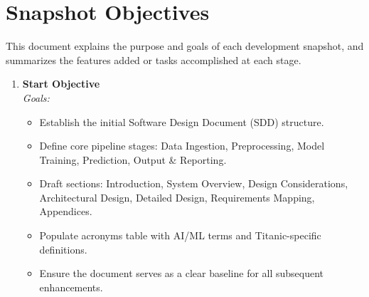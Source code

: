 \documentclass[12pt]{article}
\begin{document}
\section*{Snapshot Objectives}

This document explains the purpose and goals of each development snapshot, and summarizes the features added or tasks accomplished at each stage.

\begin{enumerate}[label=\textbf{\arabic*.}]

  \item \textbf{Start Objective}\\
    \emph{Goals:}  
    \begin{itemize}
      \item Establish the initial Software Design Document (SDD) structure.
      \item Define core pipeline stages: Data Ingestion, Preprocessing, Model Training, Prediction, Output \& Reporting.
      \item Draft sections: Introduction, System Overview, Design Considerations, Architectural Design, Detailed Design, Requirements Mapping, Appendices.
      \item Populate acronyms table with AI/ML terms and Titanic-specific definitions.
      \item Ensure the document serves as a clear baseline for all subsequent enhancements.
    \end{itemize}


\end{enumerate}
\end{document}

